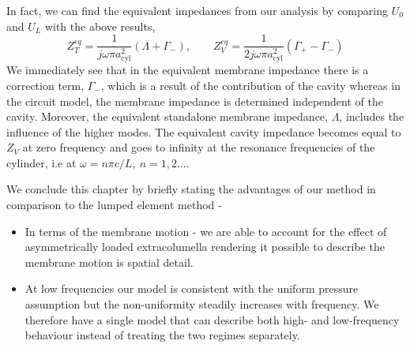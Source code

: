 In fact, we can find the equivalent impedances from our analysis by comparing $U_0$ and $U_L$ with the above results,
\begin{equation}
 Z^{eq}_T=\frac{1}{j\omega\pi a^2_{\mathrm{cyl}}}(\Lambda+\Gamma_-),\qquad Z^{eq}_V=\frac{1}{2j\omega\pi a^2_{\mathrm{cyl}}}(\Gamma_+-\Gamma_-)
\end{equation}
We immediately see that in the equivalent membrane impedance there is a correction term, $\Gamma_-$, which is a result of the contribution of the cavity whereas in 
the circuit model, the membrane impedance is determined independent of the cavity. Moreover, the equivalent standalone membrane impedance, $\Lambda$,
includes the influence of the higher modes. The equivalent cavity impedance becomes equal to $Z_V$ at zero frequency and goes to infinity at the
resonance frequencies of the cylinder, i.e at $\omega=n\pi c/L,\ n=1,2\ldots$.
% 
\vspace{\baselineskip}

\noindent We conclude this chapter by briefly stating the advantages of our method in comparison to the lumped element method - 
\begin{itemize}
 \item In terms of the membrane motion - we are able to account for the effect of asymmetrically loaded extracolumella rendering it possible to describe the membrane motion is spatial detail.
 \item At low frequencies our model is consistent with the uniform pressure assumption but the non-uniformity steadily increases with frequency.
  We therefore have a single model that can describe both high- and low-frequency behaviour instead of treating the two regimes separately.
\end{itemize}

